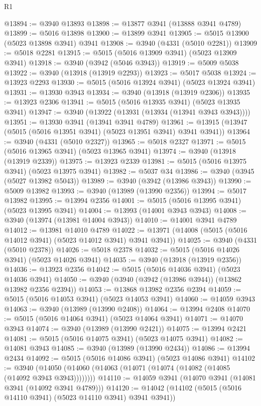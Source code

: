 \begin{lexlean}{R1}
\begin{coremodule}
@13894 := @3940 @13893
@13898 := @13877 @3941 (@13888 @3941 @4789)
@13899 := @5016 @13898
@13900 := @13899 @3941
@13905 := @5015 @13900 (@5023 @13898 @3941) @3941
@13908 := @3940 (@4331 (@5010 @2281))
@13909 := @5018 @2281
@13915 := @5015 (@5016 @13909 @3941) (@5023 @13909 @3941)
@13918 := @3940 (@3942 (@5046 @3943))
@13919 := @5009 @5038
@13922 := @3940 (@13918 (@13919 @2293))
@13923 := @5017 @5038
@13924 := @13923 @2293
@13930 := @5015 (@5016 @13924 @3941) (@5023 @13924 @3941)
@13931 := @13930 @3943
@13934 := @3940 (@13918 (@13919 @2306))
@13935 := @13923 @2306
@13941 := @5015 (@5016 @13935 @3941) (@5023 @13935 @3941)
@13947 := @3940 (@13922 (@13931 (@13934 (@13941 @3943 @3943))))
@13951 := @13930 @3941 (@13941 @3941 @4789)
@13961 := @13915 (@13947 (@5015 (@5016 @13951 @3941) (@5023 @13951 @3941) @3941 @3941))
@13964 := @3940 (@4331 (@5010 @2327))
@13965 := @5018 @2327
@13971 := @5015 (@5016 @13965 @3941) (@5023 @13965 @3941)
@13974 := @3940 (@13918 (@13919 @2339))
@13975 := @13923 @2339
@13981 := @5015 (@5016 @13975 @3941) (@5023 @13975 @3941)
@13982 := @5037 @34
@13986 := @3940 (@3945 (@5027 @13982 @5043))
@13989 := @3940 (@3942 (@13986 @3943))
@13990 := @5009 @13982
@13993 := @3940 (@13989 (@13990 @2356))
@13994 := @5017 @13982
@13995 := @13994 @2356
@14001 := @5015 (@5016 @13995 @3941) (@5023 @13995 @3941)
@14004 := @13993 (@14001 @3943 @3943)
@14008 := @3940 (@13974 (@13981 @14004 @3943))
@14010 := @14001 @3941 @4789
@14012 := @13981 @14010 @4789
@14022 := @13971 (@14008 (@5015 (@5016 @14012 @3941) (@5023 @14012 @3941) @3941 @3941))
@14025 := @3940 (@4331 (@5010 @2378))
@14026 := @5018 @2378
@14032 := @5015 (@5016 @14026 @3941) (@5023 @14026 @3941)
@14035 := @3940 (@13918 (@13919 @2356))
@14036 := @13923 @2356
@14042 := @5015 (@5016 @14036 @3941) (@5023 @14036 @3941)
@14050 := @3940 (@3940 (@3942 (@13986 @3944)) (@13862 @13982 @2356 @2394))
@14053 := @13868 @13982 @2356 @2394
@14059 := @5015 (@5016 @14053 @3941) (@5023 @14053 @3941)
@14060 := @14059 @3943
@14063 := @3940 (@13989 (@13990 @2408))
@14064 := @13994 @2408
@14070 := @5015 (@5016 @14064 @3941) (@5023 @14064 @3941)
@14071 := @14070 @3943
@14074 := @3940 (@13989 (@13990 @2421))
@14075 := @13994 @2421
@14081 := @5015 (@5016 @14075 @3941) (@5023 @14075 @3941)
@14082 := @14081 @3943
@14085 := @3940 (@13989 (@13990 @2434))
@14086 := @13994 @2434
@14092 := @5015 (@5016 @14086 @3941) (@5023 @14086 @3941)
@14102 := @3940 (@14050 (@14060 (@14063 (@14071 (@14074 (@14082 (@14085 (@14092 @3943 @3943))))))))
@14110 := @14059 @3941 (@14070 @3941 (@14081 @3941 (@14092 @3941 @4789)))
@14120 := @14042 (@14102 (@5015 (@5016 @14110 @3941) (@5023 @14110 @3941) @3941 @3941))

\end{coremodule}
\end{lexlean}
